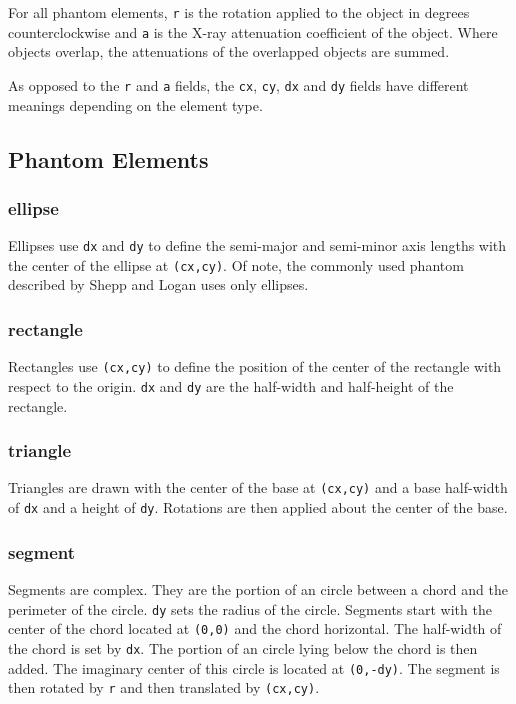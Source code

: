 For all phantom elements, \texttt{r} is the rotation applied to the object in degrees
counterclockwise and \texttt{a} is the X-ray attenuation
coefficient of the object. Where objects overlap, the attenuations
of the overlapped objects are summed.

As opposed to the \texttt{r} and \texttt{a} fields, the \texttt{cx},
\texttt{cy}, \texttt{dx} and \texttt{dy} fields have different
meanings depending on the element type.



\subsection{Phantom Elements}\label{phantomelements}

\subsubsection{ellipse}
Ellipses use \texttt{dx} and \texttt{dy} to define the semi-major and
semi-minor axis lengths with the center of the ellipse at \texttt{(cx,cy)}.
Of note, the commonly used phantom described by
Shepp and Logan\cite{SHEPP74} uses only ellipses.

\subsubsection{rectangle}
Rectangles use \texttt{(cx,cy)} to define the position of
the center of the rectangle with respect to the origin.  \texttt{dx}
and \texttt{dy} are the half-width and half-height of the rectangle.

\subsubsection{triangle}
Triangles are drawn with the center of the base at \texttt{(cx,cy)}
and a base half-width of \texttt{dx} and a height of \texttt{dy}.
Rotations are then applied about the center of the base.

\subsubsection{segment}
Segments are complex. They are the portion of an circle between a
chord and the perimeter of the circle.  \texttt{dy} sets the
radius of the circle. Segments start with the center of the chord
located at \texttt{(0,0)} and the chord horizontal. The half-width
of the chord is set by \texttt{dx}.  The portion of an circle
lying below the chord is then added. The imaginary center of this
circle is located at \texttt{(0,-dy)}. The segment is then rotated
by \texttt{r} and then translated by \texttt{(cx,cy)}.

